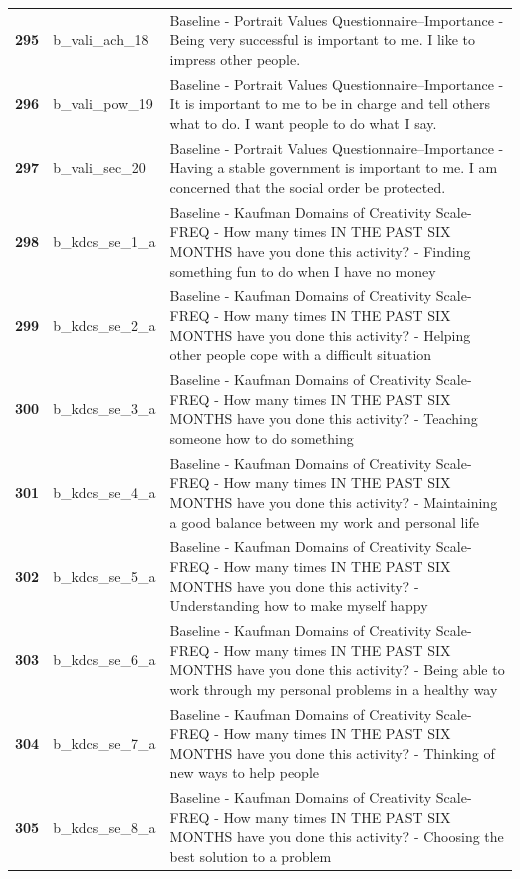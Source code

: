 \documentclass[
  letterpaper,
  DIV=11,
  numbers=noendperiod]{scrartcl}
\begin{document}
\begin{longtable}[t]{>{}cll}
\textbf{295} & b\_vali\_ach\_18 & Baseline - Portrait Values Questionnaire--Importance - Being very successful is important to me. I like to impress other people.\\
\addlinespace
\textbf{296} & b\_vali\_pow\_19 & Baseline - Portrait Values Questionnaire--Importance - It is important to me to be in charge and tell others what to do. I want people to do what I say.\\
\textbf{297} & b\_vali\_sec\_20 & Baseline - Portrait Values Questionnaire--Importance - Having a stable government is important to me. I am concerned that the social order be protected.\\
\textbf{298} & b\_kdcs\_se\_1\_a & Baseline - Kaufman Domains of Creativity Scale-FREQ - How many times IN THE PAST SIX MONTHS have you done this activity? - Finding something fun to do when I have no money\\
\textbf{299} & b\_kdcs\_se\_2\_a & Baseline - Kaufman Domains of Creativity Scale-FREQ - How many times IN THE PAST SIX MONTHS have you done this activity? - Helping other people cope with a difficult situation\\
\textbf{300} & b\_kdcs\_se\_3\_a & Baseline - Kaufman Domains of Creativity Scale-FREQ - How many times IN THE PAST SIX MONTHS have you done this activity? - Teaching someone how to do something\\
\addlinespace
\textbf{301} & b\_kdcs\_se\_4\_a & Baseline - Kaufman Domains of Creativity Scale-FREQ - How many times IN THE PAST SIX MONTHS have you done this activity? - Maintaining a good balance between my work and personal life\\
\textbf{302} & b\_kdcs\_se\_5\_a & Baseline - Kaufman Domains of Creativity Scale-FREQ - How many times IN THE PAST SIX MONTHS have you done this activity? - Understanding how to make myself happy\\
\textbf{303} & b\_kdcs\_se\_6\_a & Baseline - Kaufman Domains of Creativity Scale-FREQ - How many times IN THE PAST SIX MONTHS have you done this activity? - Being able to work through my personal problems in a healthy way\\
\textbf{304} & b\_kdcs\_se\_7\_a & Baseline - Kaufman Domains of Creativity Scale-FREQ - How many times IN THE PAST SIX MONTHS have you done this activity? - Thinking of new ways to help people\\
\textbf{305} & b\_kdcs\_se\_8\_a & Baseline - Kaufman Domains of Creativity Scale-FREQ - How many times IN THE PAST SIX MONTHS have you done this activity? - Choosing the best solution to a problem\\

\end{longtable}
\end{document}
